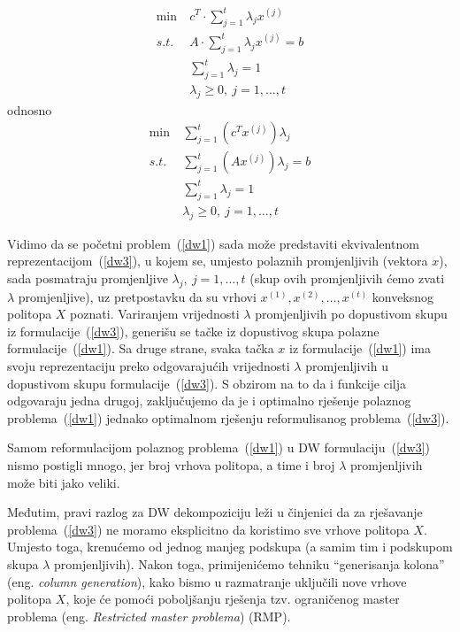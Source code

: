 \documentclass[a4paper, utf8, 11pt, colorlinks]{book}
\begin{document}
 
   \begin{equation}
 	\begin{aligned}\label{dw2}
 		\min\  &c^T\cdot \sum_{j=1}^t\lambda_jx^{(j)}\\
 		s.t.\  &A\cdot \sum_{j=1}^t\lambda_jx^{(j)}=b\\
 		 		 &\sum_{j=1}^t\lambda_j = 1\\
 		&\lambda_j\geqslant 0,\ j = 1,\ldots,t
 	\end{aligned}
 \end{equation}
odnosno
    \begin{equation}
 	\begin{aligned}\label{dw3}
 		\min\  & \sum_{j=1}^t(c^T x^{(j)})\lambda_j\\
 		s.t.\  &\sum_{j=1}^t (A x^{(j)})\lambda_j=b\\
 		&\sum_{j=1}^t\lambda_j = 1\\
 		&\lambda_j\geqslant 0,\ j = 1,\ldots,t
 	\end{aligned}
 \end{equation}
 
 Vidimo da se početni problem~(\ref{dw1}) sada može predstaviti ekvivalentnom reprezentacijom~(\ref{dw3}), u kojem se, umjesto polaznih promjenljivih (vektora $x$), sada posmatraju promjenljive $\lambda_j,\ j = 1,\ldots,t$ (skup ovih promjenljivih ćemo zvati $\lambda$ promjenljive), uz pretpostavku da su  vrhovi $x^{(1)},x^{(2)},\dots,x^{(t)}$ konveksnog politopa $X$ poznati. Variranjem vrijednosti $\lambda$ promjenljivih po dopustivom skupu iz formulacije~(\ref{dw3}), generišu se tačke iz dopustivog skupa polazne formulacije~(\ref{dw1}). Sa druge strane, svaka tačka $x$ iz formulacije~(\ref{dw1}) ima svoju reprezentaciju preko odgovarajućih vrijednosti  $\lambda$ promjenljivih u dopustivom skupu formulacije~(\ref{dw3}). S obzirom na to da i funkcije cilja odgovaraju jedna drugoj, zaključujemo da je i optimalno rješenje polaznog problema~(\ref{dw1}) jednako optimalnom rješenju reformulisanog problema~(\ref{dw3}).
 
 Samom reformulacijom polaznog problema~(\ref{dw1}) u DW formulaciju~(\ref{dw3}) nismo postigli mnogo, jer broj vrhova politopa, a time i broj $\lambda$ promjenljivih može biti jako veliki.
 
 Međutim, pravi razlog za DW dekompoziciju leži u činjenici da za rješavanje problema~(\ref{dw3}) ne moramo eksplicitno da koristimo sve vrhove politopa $X$. Umjesto toga, krenućemo od jednog   manjeg podskupa (a samim tim i podskupom skupa $\lambda$ promjenljivih). Nakon toga, primijenićemo tehniku ``generisanja kolona'' (eng. \emph{column generation}), kako bismo u razmatranje uključili nove vrhove politopa $X$, koje će pomoći poboljšanju rješenja tzv. ograničenog master problema (eng. \emph{Restricted master problema}) (RMP).
 
\end{document}
